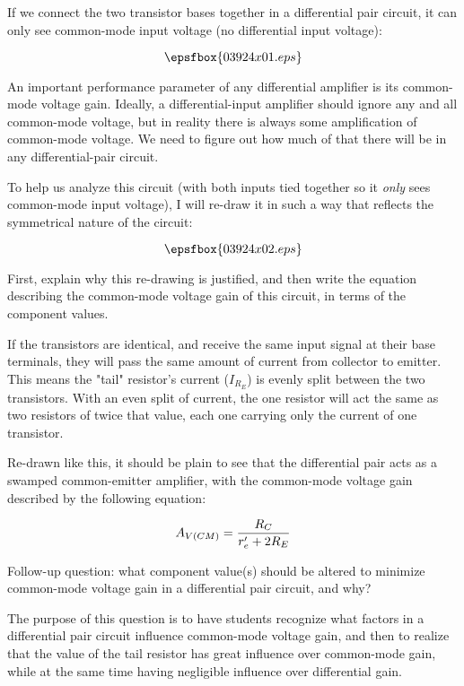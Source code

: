 

If we connect the two transistor bases together in a differential pair circuit, it can only see common-mode input voltage (no differential input voltage):

$$\epsfbox{03924x01.eps}$$

An important performance parameter of any differential amplifier is its common-mode voltage gain.  Ideally, a differential-input amplifier should ignore any and all common-mode voltage, but in reality there is always some amplification of common-mode voltage.  We need to figure out how much of that there will be in any differential-pair circuit.

To help us analyze this circuit (with both inputs tied together so it {\it only} sees common-mode input voltage), I will re-draw it in such a way that reflects the symmetrical nature of the circuit:

$$\epsfbox{03924x02.eps}$$

First, explain why this re-drawing is justified, and then write the equation describing the common-mode voltage gain of this circuit, in terms of the component values.







If the transistors are identical, and receive the same input signal at their base terminals, they will pass the same amount of current from collector to emitter.  This means the "tail" resistor's current ($I_{R_E}$) is evenly split between the two transistors.  With an even split of current, the one resistor will act the same as two resistors of twice that value, each one carrying only the current of one transistor.

Re-drawn like this, it should be plain to see that the differential pair acts as a swamped common-emitter amplifier, with the common-mode voltage gain described by the following equation:

$$A_{V(CM)} = {R_C \over {r'_e + 2R_E}}$$

\vskip 10pt

Follow-up question: what component value(s) should be altered to minimize common-mode voltage gain in a differential pair circuit, and why?







The purpose of this question is to have students recognize what factors in a differential pair circuit influence common-mode voltage gain, and then to realize that the value of the tail resistor has great influence over common-mode gain, while at the same time having negligible influence over differential gain.




